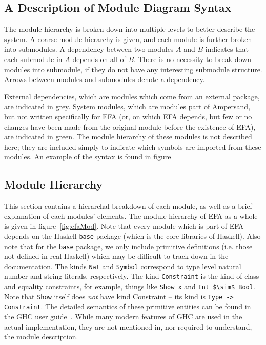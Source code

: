 \subsection{A Description of Module Diagram Syntax}\label{subsec:ModuleSyntax}

The module hierarchy is broken down into multiple levels to better describe the
system.  A coarse module hierarchy is given, and each module is further broken
into submodules.  A dependency between two modules $A$ and $B$ indicates that
each submodule in $A$ depends on all of $B$. There is no necessity to break
down modules into submodule, if they do not have any interesting submodule 
structure. Arrows between modules and submodules denote a dependency. 

External dependencies, which are modules which come from an external package,
are indicated in {\color{grey}grey}. System modules, which are modules part of
Ampersand, but not written specifically for EFA (or, on which EFA depends, but
few or no changes have been made from the original module before the existence
of EFA), are indicated in {\color{applegreen}green}. The module hierarchy of
these modules is not described here; they are included simply to indicate which
symbols are imported from these modules. An example of the syntax is found in
figure%

\subsection{Module Hierarchy}

This section contains a hierarchal breakdown of each module, as well as a brief
explanation of each modules' elements. The module hierarchy of EFA as a whole 
is 
given in figure~\ref{fig:efaMod}.  Note
that every module which is part of EFA depends on the Haskell \texttt{base} 
package
(which is the core libraries of Haskell). Also note that for the \texttt{base}
package, we only include primitive definitions (i.e. those not defined in real
Haskell) which may be difficult to track down in the documentation. The kinds
\lstinline{Nat} and \lstinline{Symbol} correspond to type level natural number 
and string
literals, respectively. The kind \lstinline{Constraint} is the kind of class and
equality constraints, for example, things like \lstinline{Show x} and 
\lstinline[mathescape]|Int $\sim$ Bool|.  
Note that \texttt{Show} itself does \emph{not} have kind Constraint --
its kind is \lstinline{Type -> Constraint}. The detailed semantics of these
primitive entities can be found in the GHC user guide~\cite{ghcUserGuide}. While
many modern features of GHC are used in the actual implementation, they are not
mentioned in, nor required to understand, the module description.

